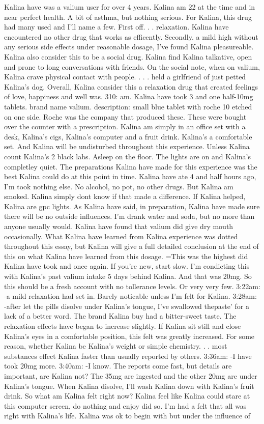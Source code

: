 \documentclass[12pt]{book}
\begin{document}
Kalina have was a valium user for over 4 years. Kalina am 22 at the time and in near perfect health. A bit of asthma, but nothing serious. For Kalina, this drug had many used and I'll name a few. First off. . . relaxation. Kalina have encountered no other drug that works as efficently. Secondly. a mild high without any serious side effects under reasonable dosage, I've found Kalina pleasureable. Kalina also consider this to be a social drug. Kalina find Kalina talkative, open and prone to long conversations with friends. On the social note, when on valium, Kalina crave physical contact with people. . . . held a girlfriend of just petted Kalina's dog. Overall, Kalina consider this a relaxation drug that created feelings of love, happiness and well was. 310: am. Kalina have took 3 and one half-10mg tablets. brand name valium. description: small blue tablet with roche 10 etched on one side. Roche was the company that produced these. These were bought over the counter with a prescription. Kalina am simply in an office set with a desk, Kalina's cigs, Kalina's computer and a fruit drink. Kalina's a comfortable set. And Kalina will be undisturbed throughout this experience. Unless Kalina count Kalina's 2 black labs. Asleep on the floor. The lights are on and Kalina's completley quiet. The preparations Kalina have made for this experience was the best Kalina could do at this point in time. Kalina have ate 4 and half hours ago, I'm took nothing else. No alcohol, no pot, no other drugs. But Kalina am smoked. Kalina simply dont know if that made a difference. If Kalina helped, Kalina are gpc lights. As Kalina have said, in preparation, Kalina have made sure there will be no outside influences. I'm drank water and soda, but no more than anyone usually would. Kalina have found that valium did give dry mouth occasionally. What Kalina have learned from Kalina experience was dotted throughout this essay, but Kalina will give a full detailed conclusion at the end of this on what Kalina have learned from this dosage. =This was the highest did Kalina have took and once again. If you're new, start slow. I'm condicting this with Kalina's past valium intake 5 days behind Kalina. And that was 20mg. So this should be a fresh account with no tollerance levels. Or very very few. 3:22am: -a mild relaxation had set in. Barely noticable unless I'm felt for Kalina. 3:28am: -after let the pills disolve under Kalina's tongue, I've swallowed thepaste' for a lack of a better word. The brand Kalina buy had a bitter-sweet taste. The relaxation effects have began to increase slightly. If Kalina sit still and close Kalina's eyes in a comfortable position, this felt was greatly increased. For some reason, whether Kalina be Kalina's weight or simple chemistry. . . most substances effect Kalina faster than usually reported by others. 3:36am: -I have took 20mg more. 3:40am: -I know. The reports come fast, but details are important, are Kalina not? The 35mg are ingested and the other 20mg are under Kalina's tongue. When Kalina disolve, I'll wash Kalina down with Kalina's fruit drink. So what am Kalina felt right now? Kalina feel like Kalina could stare at this computer screen, do nothing and enjoy did so. I'm had a felt that all was right with Kalina's life. Kalina was ok to begin with but under the influence of 
\end{document}
